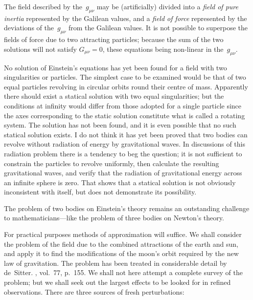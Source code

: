 \documentclass[12pt]{book}
\begin{document}
%
%
%

The field described by the~$g_{\mu\nu}$ may be (artificially) divided into a \emph{field of
pure inertia} represented by the Galilean values, and a \emph{field of force} represented
by the deviations of the~$g_{\mu\nu}$ from the Galilean values. It is not possible
to superpose the fields of force due to two attracting particles; because the
sum of the two solutions will not satisfy $G_{\mu\nu} = 0$, these equations being non-linear
in the~$g_{\mu\nu}$.

No solution of Einstein's equations has yet been found for a field with two
singularities or particles. The simplest case to be examined would be that of
two equal particles revolving in circular orbits round their centre of mass.
Apparently there should exist a statical solution with two equal singularities;
but the conditions at infinity would differ from those adopted for a single
particle since the axes corresponding to the static solution constitute what is
called a rotating system. The solution has not been found, and it is even
possible that no such statical solution exists. I do not think it has yet been
proved that two bodies can revolve without radiation of energy by gravitational
waves. In discussions of this radiation problem there is a tendency to beg the
question; it is not sufficient to constrain the particles to revolve uniformly,
then calculate the resulting gravitational waves, and verify that the radiation
of gravitational energy across an infinite sphere is zero. That shows that a
statical solution is not obviously inconsistent with itself, but does not demonstrate
its possibility.

The problem of two bodies on Einstein's theory remains an outstanding
challenge to mathematicians---like the problem of three bodies on Newton's
theory.

For practical purposes methods of approximation will suffice. We shall
consider the problem of the field due to the combined attractions of the earth
and sun, and apply it to find the modifications of the moon's orbit required by
the new law of gravitation. The problem has been treated in considerable
detail by de~Sitter\footnotemark.\footnotetext
  {, vol.~77, p.~155.}
We shall not here attempt a complete survey of the
problem; but we shall seek out the largest effects to be looked for in refined
observations. There are three sources of fresh perturbations:
\end{document}
